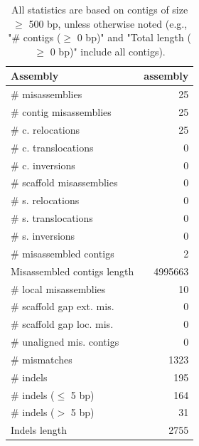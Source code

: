\documentclass[12pt,a4paper]{article}
\begin{document}
\begin{table}[ht]
\begin{center}
\caption{All statistics are based on contigs of size $\geq$ 500 bp, unless otherwise noted (e.g., "\# contigs ($\geq$ 0 bp)" and "Total length ($\geq$ 0 bp)" include all contigs).}
\begin{tabular}{|l*{1}{|r}|}
\hline
Assembly & assembly \\ \hline
\# misassemblies & 25 \\ \hline
\hspace{2mm}\# contig misassemblies & 25 \\ \hline
\hspace{5mm}\# c. relocations & 25 \\ \hline
\hspace{5mm}\# c. translocations & 0 \\ \hline
\hspace{5mm}\# c. inversions & 0 \\ \hline
\hspace{2mm}\# scaffold misassemblies & 0 \\ \hline
\hspace{5mm}\# s. relocations & 0 \\ \hline
\hspace{5mm}\# s. translocations & 0 \\ \hline
\hspace{5mm}\# s. inversions & 0 \\ \hline
\# misassembled contigs & 2 \\ \hline
Misassembled contigs length & 4995663 \\ \hline
\# local misassemblies & 10 \\ \hline
\# scaffold gap ext. mis. & 0 \\ \hline
\# scaffold gap loc. mis. & 0 \\ \hline
\# unaligned mis. contigs & 0 \\ \hline
\# mismatches & 1323 \\ \hline
\# indels & 195 \\ \hline
\hspace{5mm}\# indels ($\leq$ 5 bp) & 164 \\ \hline
\hspace{5mm}\# indels ($>$ 5 bp) & 31 \\ \hline
Indels length & 2755 \\ \hline
\end{tabular}
\end{center}
\end{table}
\end{document}
